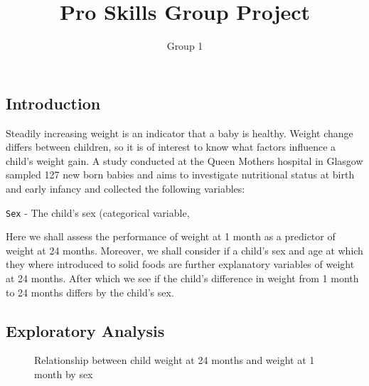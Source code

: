 \documentclass[
  letterpaper,
  DIV=11,
  numbers=noendperiod]{scrartcl}
\title{Pro Skills Group Project}
\author{Group 1}
\date{}
\begin{document}
\maketitle

\subsection{Introduction}\label{introduction}

Steadily increasing weight is an indicator that a baby is healthy.
Weight change differs between children, so it is of interest to know
what factors influence a child's weight gain. A study conducted at the
Queen Mothers hospital in Glasgow sampled 127 new born babies and aims
to investigate nutritional status at birth and early infancy and
collected the following variables:

\texttt{Sex} - The child's sex (categorical variable,

Here we shall assess the performance of weight at 1 month as a predictor
of weight at 24 months. Moreover, we shall consider if a child's sex and
age at which they where introduced to solid foods are further
explanatory variables of weight at 24 months. After which we see if the
child's difference in weight from 1 month to 24 months differs by the
child's sex.

\subsection{Exploratory Analysis}\label{exploratory-analysis}

\begin{figure}


\caption{\label{fig-scat-wt24-wt1}Relationship between child weight at
24 months and weight at 1 month by sex}

\end{figure}%
\end{document}
